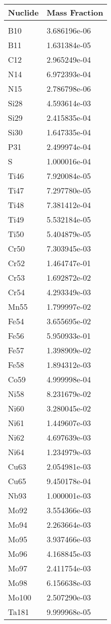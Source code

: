 \begin{centering}
\begin{longtable}[ht!]
\caption{Table showing the isotopic description of material M100}
\label{table:material_M100}
\end{longtable}\clearpage

\begin{longtable}[ht!]
{ p{} | p{} }
\hline
Nuclide & Mass Fraction\\
\hline
\\
B10 & 3.686196e-06\\
B11 & 1.631384e-05\\
C12 & 2.965249e-04\\
N14 & 6.972393e-04\\
N15 & 2.786798e-06\\
Si28 & 4.593614e-03\\
Si29 & 2.415835e-04\\
Si30 & 1.647335e-04\\
P31 & 2.499974e-04\\
S & 1.000016e-04\\
Ti46 & 7.920084e-05\\
Ti47 & 7.297780e-05\\
Ti48 & 7.381412e-04\\
Ti49 & 5.532184e-05\\
Ti50 & 5.404879e-05\\
Cr50 & 7.303945e-03\\
Cr52 & 1.464747e-01\\
Cr53 & 1.692872e-02\\
Cr54 & 4.293349e-03\\
Mn55 & 1.799997e-02\\
Fe54 & 3.655695e-02\\
Fe56 & 5.950933e-01\\
Fe57 & 1.398909e-02\\
Fe58 & 1.894312e-03\\
Co59 & 4.999998e-04\\
Ni58 & 8.231679e-02\\
Ni60 & 3.280045e-02\\
Ni61 & 1.449607e-03\\
Ni62 & 4.697639e-03\\
Ni64 & 1.234979e-03\\
Cu63 & 2.054981e-03\\
Cu65 & 9.450178e-04\\
Nb93 & 1.000001e-03\\
Mo92 & 3.554366e-03\\
Mo94 & 2.263664e-03\\
Mo95 & 3.937466e-03\\
Mo96 & 4.168845e-03\\
Mo97 & 2.411754e-03\\
Mo98 & 6.156638e-03\\
Mo100 & 2.507290e-03\\
Ta181 & 9.999968e-05\\


\end{longtable}
\end{centering}
